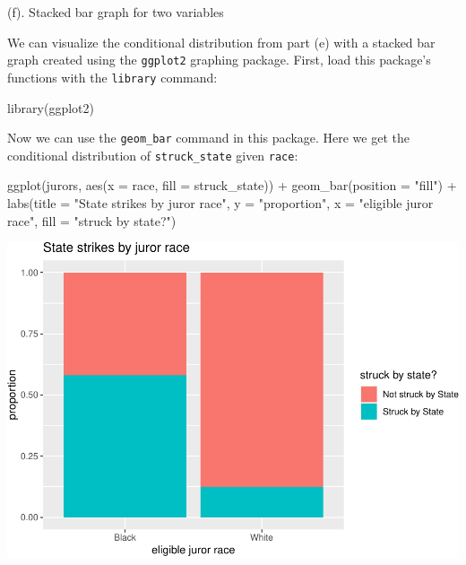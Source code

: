 \documentclass[
]{book}
\newenvironment{Shaded}{\begin{snugshade}}{\end{snugshade}}
\newcommand{\AttributeTok}[1]{\textcolor[rgb]{0.77,0.63,0.00}{#1}}
\newcommand{\FunctionTok}[1]{\textcolor[rgb]{0.00,0.00,0.00}{#1}}
\newcommand{\NormalTok}[1]{#1}
\newcommand{\SpecialCharTok}[1]{\textcolor[rgb]{0.00,0.00,0.00}{#1}}
\newcommand{\StringTok}[1]{\textcolor[rgb]{0.31,0.60,0.02}{#1}}
\begin{document}
(f). Stacked bar graph for two variables

We can visualize the conditional distribution from part (e) with a stacked bar graph created using the \texttt{ggplot2} graphing package. First, load this package's functions with the \texttt{library} command:

\begin{Shaded}
\begin{Highlighting}[]
\FunctionTok{library}\NormalTok{(ggplot2)}
\end{Highlighting}
\end{Shaded}

Now we can use the \texttt{geom\_bar} command in this package. Here we get the conditional distribution of \texttt{struck\_state} given \texttt{race}:

\begin{Shaded}
\begin{Highlighting}[]
\FunctionTok{ggplot}\NormalTok{(jurors, }\FunctionTok{aes}\NormalTok{(}\AttributeTok{x =}\NormalTok{ race, }\AttributeTok{fill =}\NormalTok{ struck\_state)) }\SpecialCharTok{+} 
  \FunctionTok{geom\_bar}\NormalTok{(}\AttributeTok{position =} \StringTok{"fill"}\NormalTok{) }\SpecialCharTok{+} 
  \FunctionTok{labs}\NormalTok{(}\AttributeTok{title =} \StringTok{"State strikes by juror race"}\NormalTok{, }\AttributeTok{y =} \StringTok{"proportion"}\NormalTok{, }
       \AttributeTok{x =} \StringTok{"eligible juror race"}\NormalTok{, }\AttributeTok{fill =} \StringTok{"struck by state?"}\NormalTok{)}
\end{Highlighting}
\end{Shaded}

\includegraphics[width=1\linewidth]{Class_Activity_4_files/figure-latex/unnamed-chunk-13-1}
\end{document}
